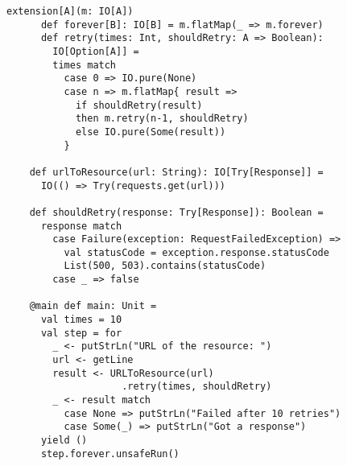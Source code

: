 \begin{figure}[htp]
  \begin{lstlisting}[language=scala3, caption={Esempio di codice monadico che incapsula i side effect all'interno della monade IO per implementare una politica di \emph{retry} per le richieste HTTP.}, label={lst:io-http}]
    extension[A](m: IO[A])
      def forever[B]: IO[B] = m.flatMap(_ => m.forever)
      def retry(times: Int, shouldRetry: A => Boolean):
        IO[Option[A]] =
        times match
          case 0 => IO.pure(None)
          case n => m.flatMap{ result => 
            if shouldRetry(result)
            then m.retry(n-1, shouldRetry)
            else IO.pure(Some(result))
          }

    def urlToResource(url: String): IO[Try[Response]] =
      IO(() => Try(requests.get(url)))

    def shouldRetry(response: Try[Response]): Boolean =
      response match
        case Failure(exception: RequestFailedException) =>
          val statusCode = exception.response.statusCode
          List(500, 503).contains(statusCode)
        case _ => false

    @main def main: Unit = 
      val times = 10
      val step = for 
        _ <- putStrLn("URL of the resource: ")
        url <- getLine
        result <- URLToResource(url)
                    .retry(times, shouldRetry)
        _ <- result match
          case None => putStrLn("Failed after 10 retries")
          case Some(_) => putStrLn("Got a response")
      yield ()
      step.forever.unsafeRun()
  \end{lstlisting}
\end{figure}
